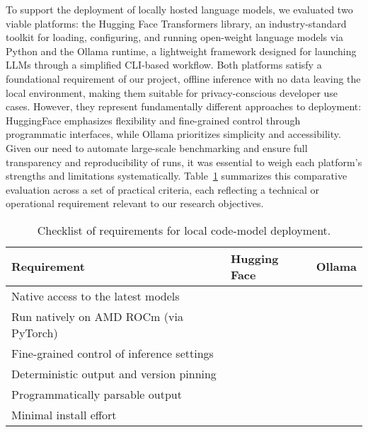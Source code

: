 To support the deployment of locally hosted language models, we evaluated two viable platforms: the Hugging Face Transformers library, an industry-standard toolkit for loading, configuring, and running open-weight language models via Python and the Ollama runtime, a lightweight framework designed for launching \glspl{LLM} through a simplified CLI-based workflow. Both platforms satisfy a foundational requirement of our project, offline inference with no data leaving the local environment, making them suitable for privacy-conscious developer use cases. However, they represent fundamentally different approaches to deployment: HuggingFace emphasizes flexibility and fine-grained control through programmatic interfaces, while Ollama prioritizes simplicity and accessibility. Given our need to automate large-scale benchmarking and ensure full transparency and reproducibility of runs, it was essential to weigh each platform’s strengths and limitations systematically. Table~\ref{tab:platform-checklist} summarizes this comparative evaluation across a set of practical criteria, each reflecting a technical or operational requirement relevant to our research objectives.

\begin{table}[ht]
	\centering
	\caption{Checklist of requirements for local code-model deployment.}
	\label{tab:platform-checklist}

	\renewcommand{\arraystretch}{1.2}      %
	\begin{tabularx}{\textwidth}{@{}X
		>{\centering\arraybackslash}p{3cm}
		>{\centering\arraybackslash}p{3cm}@{}}
		\toprule
		\textbf{Requirement}                       & \textbf{Hugging Face} & \textbf{Ollama} \\
		\midrule
		Native access to the latest models         & \checkYes             & \checkNo        \\
		Run natively on AMD ROCm (via PyTorch)     & \checkYes             & \checkNo        \\
		Fine-grained control of inference settings & \checkYes             & \checkNo        \\
		Deterministic output and version pinning   & \checkYes             & \checkNo        \\
		Programmatically parsable output           & \checkYes             & \checkNo        \\
		Minimal install effort                     & \checkYes             & \checkYes       \\
		\bottomrule
	\end{tabularx}
\end{table}


